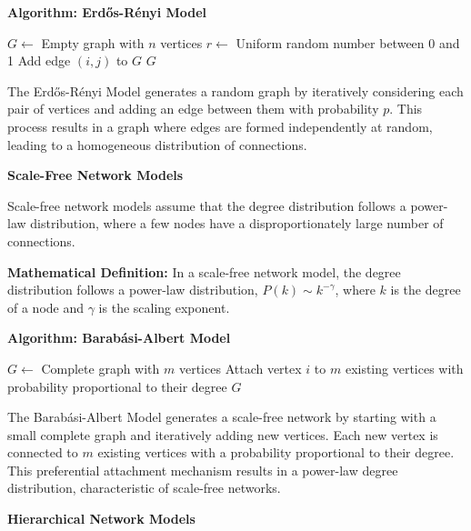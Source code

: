 \documentclass[12pt]{book} %
\begin{document}
\textbf{Algorithm: Erdős-Rényi Model}
\FloatBarrier
\begin{algorithm}
\caption{Erdős-Rényi Model}
\begin{algorithmic}[1]
\State $G \gets$ Empty graph with $n$ vertices
        \State $r \gets$ Uniform random number between 0 and 1
            \State Add edge $(i, j)$ to $G$
        \EndIf
    \EndFor
\EndFor
\State \Return $G$
\EndFunction
\end{algorithmic}
\end{algorithm}
\FloatBarrier
The Erdős-Rényi Model generates a random graph by iteratively considering each pair of vertices and adding an edge between them with probability \( p \). This process results in a graph where edges are formed independently at random, leading to a homogeneous distribution of connections.

\textbf{Scale-Free Network Models}

Scale-free network models assume that the degree distribution follows a power-law distribution, where a few nodes have a disproportionately large number of connections.

\textbf{Mathematical Definition:} In a scale-free network model, the degree distribution follows a power-law distribution, \( P(k) \sim k^{-\gamma} \), where \( k \) is the degree of a node and \( \gamma \) is the scaling exponent.

\textbf{Algorithm: Barabási-Albert Model}
\FloatBarrier
\begin{algorithm}
\caption{Barabási-Albert Model}
\begin{algorithmic}[1]
\State $G \gets$ Complete graph with $m$ vertices
    \State Attach vertex $i$ to $m$ existing vertices with probability proportional to their degree
\EndFor
\State \Return $G$
\EndFunction
\end{algorithmic}
\end{algorithm}
\FloatBarrier
The Barabási-Albert Model generates a scale-free network by starting with a small complete graph and iteratively adding new vertices. Each new vertex is connected to \( m \) existing vertices with a probability proportional to their degree. This preferential attachment mechanism results in a power-law degree distribution, characteristic of scale-free networks.

\textbf{Hierarchical Network Models}
\end{document}
